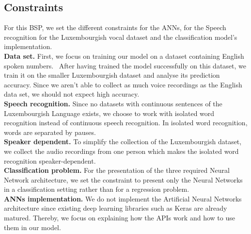 
\subsection{Constraints}

For this BSP, we set the different constraints for the ANNs, for the Speech
recognition for the Luxembourgish vocal dataset and the classification model's
implementation.\\

\textbf{Data set.} First, we focus on training our model on a dataset
containing English spoken numbers.~\cite{DBLP:journals/corr/abs-1804-03209}
After having trained the model successfully on this dataset, we train it on the
smaller Luxembourgish dataset and analyse its prediction accuracy. Since we
aren't able to collect as much voice recordings as the English data set, we
should not expect high accuracy.\\


\textbf{Speech recognition.} Since no datasets with continuous sentences of the
Luxembourgish Language exists, we choose to work with isolated word recognition
instead of continuous speech recognition. In isolated word recognition, words are
separated by pauses.\\

\textbf{Speaker dependent.} To simplify the collection of the Luxembourgish
dataset, we collect the audio recordings from one person which makes the
isolated word recognition speaker-dependent.\\

\textbf{Classification problem.} For the presentation of the three required
Neural Network architecture, we set the constraint to present only the Neural
Networks in a classification setting rather than for a regression problem. \\

\textbf{ANNs implementation.} We do not implement the Artificial Neural Networks
architecture since existing deep learning libraries such as Keras are already
matured. Thereby, we focus on explaining how the APIs work and how to use them
in our model.
